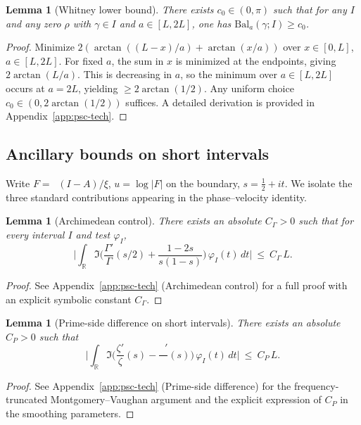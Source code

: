 \documentclass[11pt]{article}
\newtheorem{lemma}[theorem]{Lemma}
\theoremstyle{definition}
\theoremstyle{remark}
\newcommand{\R}{\mathbb{R}}
\DeclareMathOperator{\dettwo}{det_2}
\begin{document}
\begin{lemma}[Whitney lower bound]\label{lem:whitney-lower}
There exists \(c_0\in(0,\pi)\) such that for any \(I\) and any zero \(\rho\) with \(\gamma\in I\) and \(a\in[L,2L]\), one has \(\mathrm{Bal}_a(\gamma;I)\ge c_0\).
\end{lemma}
\begin{proof}
Minimize \(2(\arctan((L-x)/a)+\arctan(x/a))\) over \(x\in[0,L]\), \(a\in[L,2L]\). For fixed \(a\), the sum in \(x\) is minimized at the endpoints, giving \(2\arctan(L/a)\). This is decreasing in \(a\), so the minimum over \(a\in[L,2L]\) occurs at \(a=2L\), yielding \(\ge 2\arctan(1/2)\). Any uniform choice \(c_0\in(0,2\arctan(1/2))\) suffices. A detailed derivation is provided in Appendix~\ref{app:psc-tech}.
\end{proof}

\subsection{Ancillary bounds on short intervals}
Write \(F=\dettwo(I-A)/\xi\), \(u=\log|F|\) on the boundary, \(s=\tfrac12+it\). We isolate the three standard contributions appearing in the phase--velocity identity.

\begin{lemma}[Archimedean control]\label{lem:arch}
There exists an absolute \(C_\Gamma>0\) such that for every interval \(I\) and test \(\varphi_I\),
\[ \Big|\int_{\R} \Im\Big(\frac{\Gamma'}{\Gamma}(s/2)+\frac{1-2s}{s(1-s)}\Big)\,\varphi_I(t)\,dt\Big|\ \le\ C_\Gamma\,L.\]
\end{lemma}
\begin{proof}
See Appendix~\ref{app:psc-tech} (Archimedean control) for a full proof with an explicit symbolic constant \(C_\Gamma\).
\end{proof}

\begin{lemma}[Prime-side difference on short intervals]\label{lem:prime-short}
There exists an absolute \(C_P>0\) such that
\[ \Big|\int_{\R} \Im\Big(\frac{\zeta'}{\zeta}(s)-\frac{\dettwo'}{\dettwo}(s)\Big)\,\varphi_I(t)\,dt\Big|\ \le\ C_P\,L.\]
\end{lemma}
\begin{proof}
See Appendix~\ref{app:psc-tech} (Prime-side difference) for the frequency-truncated Montgomery--Vaughan argument and the explicit expression of \(C_P\) in the smoothing parameters.
\end{proof}
\end{document}

